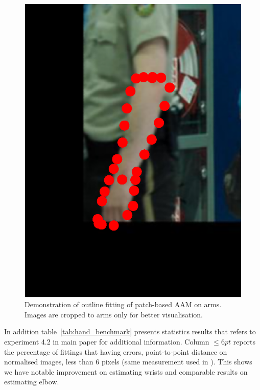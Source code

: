 \begin{figure}[!t]
    \includegraphics[height=\ofh]{Suplementory_Meterial/ExFit/0044.eps}
    \caption{Demonstration of outline fitting of patch-based AAM on arms. Images are cropped to arms only for better visualisation.}
    \label{fig:paam_fittingresults}
\end{figure}


In addition table~\ref{tab:hand_benchmark} presents statistics results that refers to experiment 4.2 in main paper for additional information. Column $\leq 6pt$ reports the percentage of fittings that having errors, point-to-point distance on normalised images, less than 6 pixels (same measurement used in \cite{pfister2015flowing}). This shows we have notable improvement on estimating wrists and comparable results on estimating elbow.


